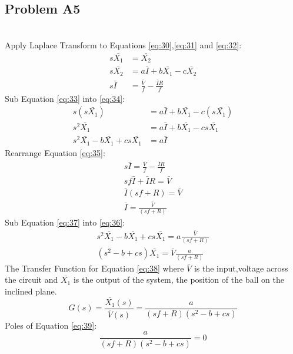 \subsection*{Problem A5} 
    \hfill \break \\
Apply Laplace Transform to Equations \eqref{eq:30},\eqref{eq:31} and \eqref{eq:32}:
\begin{align}
    s\bar{X_1} &= \bar{X_2} \label{eq:33}\\
    s\bar{X_2} &= a\bar{I} + b\bar{X_1} - c\bar{X_2}\label{eq:34} \\
    s\bar{I} &= \frac{\bar{V}}{f} - \frac{\bar{I}R}{f}\label{eq:35}
\end{align}
Sub Equation \eqref{eq:33} into \eqref{eq:34}:\\
\begin{align}
     s(s\bar{X_1}) &= a\bar{I} + b\bar{X_1} - c(s\bar{X_1})\nonumber \\
     s^2\bar{X_1} &= a\bar{I} + b\bar{X_1} - cs\bar{X_1}\nonumber \\
     s^2\bar{X_1} - b\bar{X_1} + cs\bar{X_1} &= a\bar{I} \label{eq:36}
\end{align}
Rearrange Equation \eqref{eq:35}:\\
\begin{align}
     s\bar{I} = \frac{\bar{V}}{f} - \frac{\bar{I}R}{f}\nonumber \\
     sf\bar{I}+ \bar{I}R = \bar{V} \nonumber \\
     \bar{I}(sf+ R) = \bar{V} \nonumber \\
     \bar{I} = \frac{\bar{V}}{(sf+ R)} \label{eq:37}
\end{align}
Sub Equation \eqref{eq:37} into \eqref{eq:36}:\\
\begin{align}
    s^2\bar{X_1} - b\bar{X_1} + cs\bar{X_1} = a\frac{\bar{V}}{(sf+ R)} \nonumber \\
     (s^2 - b + cs)\bar{X_1} = \bar{V}\frac{a}{(sf+ R)} \label{eq:38}
\end{align}
The Transfer Function for Equation \eqref{eq:38} where $\bar{V}$ is the input,voltage across the circuit and $\bar{X_1}$ is the output of the system, the position of the ball on the inclined plane. 
\begin{equation}\label{eq:39}
G(s) = \frac{\bar{X_1}(s)}{\bar{V}(s)} = \frac{a}{(sf+R)(s^2 - b + cs)}
\end{equation}
Poles of Equation \eqref{eq:39}:
\begin{equation} \nonumber
    \frac{a}{(sf+R)(s^2 - b + cs)} = 0
\end{equation}
